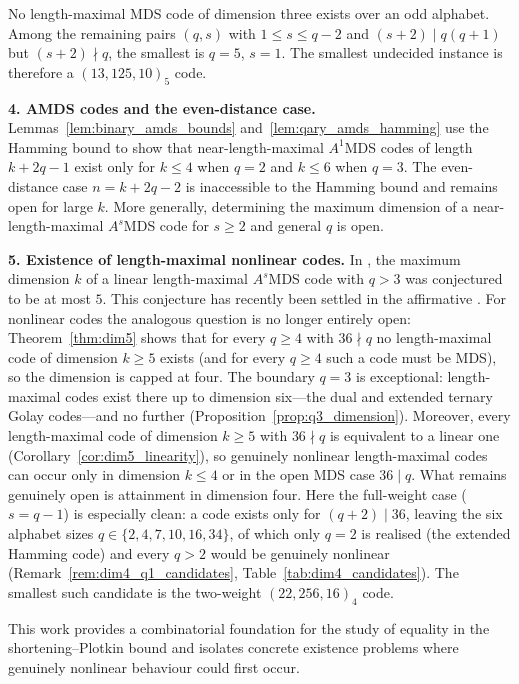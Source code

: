 \documentclass[12pt, letterpaper]{article}
\theoremstyle{plain}
\theoremstyle{definition}
\begin{document}
	No length-maximal MDS code of dimension three exists over an odd alphabet. Among the remaining pairs $(q,s)$ with $1 \le s \le q-2$ and $(s+2) \mid q(q+1)$ but $(s+2) \nmid q$, the smallest is $q=5$, $s=1$. The smallest undecided instance is therefore a $(13, 125, 10)_5$ code.
	\medskip

	\noindent\textbf{4. AMDS codes and the even-distance case.}
	Lemmas~\ref{lem:binary_amds_bounds} and~\ref{lem:qary_amds_hamming} use the Hamming bound to show that near-length-maximal $A^1$MDS codes of length $k+2q-1$ exist only for $k \le 4$ when $q=2$ and $k \le 6$ when $q=3$. The even-distance case $n = k+2q-2$ is inaccessible to the Hamming bound and remains open for large $k$. More generally, determining the maximum dimension of a near-length-maximal $A^s$MDS code for $s \ge 2$ and general $q$ is open.

	\medskip
	
	\noindent\textbf{5. Existence of length-maximal nonlinear codes.}
	In \cite{alderson2025projectivesystems}, the maximum dimension $k$ of a linear length-maximal $A^s$MDS code with $q>3$ was conjectured to be at most $5$. This conjecture has recently been settled in the affirmative  \cite{alderson2026setssubspacesrestrictedhyperplane}. For nonlinear codes the analogous question is no longer entirely open: Theorem~\ref{thm:dim5} shows that for every $q \ge 4$ with $36 \nmid q$ no length-maximal code of dimension $k \ge 5$ exists (and for every $q \ge 4$ such a code must be MDS), so the dimension is capped at four. The boundary $q = 3$ is exceptional: length-maximal codes exist there up to dimension six---the dual and extended ternary Golay codes---and no further (Proposition~\ref{prop:q3_dimension}). Moreover, every length-maximal code of dimension $k \ge 5$ with $36 \nmid q$ is equivalent to a linear one (Corollary~\ref{cor:dim5_linearity}), so genuinely nonlinear length-maximal codes can occur only in dimension $k \le 4$ or in the open MDS case $36 \mid q$. What remains genuinely open is attainment in dimension four. Here the full-weight case ($s=q-1$) is especially clean: a code exists only for $(q+2)\mid 36$, leaving the six alphabet sizes $q\in\{2,4,7,10,16,34\}$, of which only $q=2$ is realised (the extended Hamming code) and every $q>2$ would be genuinely nonlinear (Remark~\ref{rem:dim4_q1_candidates}, Table~\ref{tab:dim4_candidates}). The smallest such candidate is the two-weight $(22,256,16)_4$ code.

	\medskip
	
	This work provides a combinatorial foundation for the study of equality in the shortening--Plotkin bound and isolates concrete existence problems where genuinely nonlinear behaviour could first occur.
	
	
	
\end{document}

